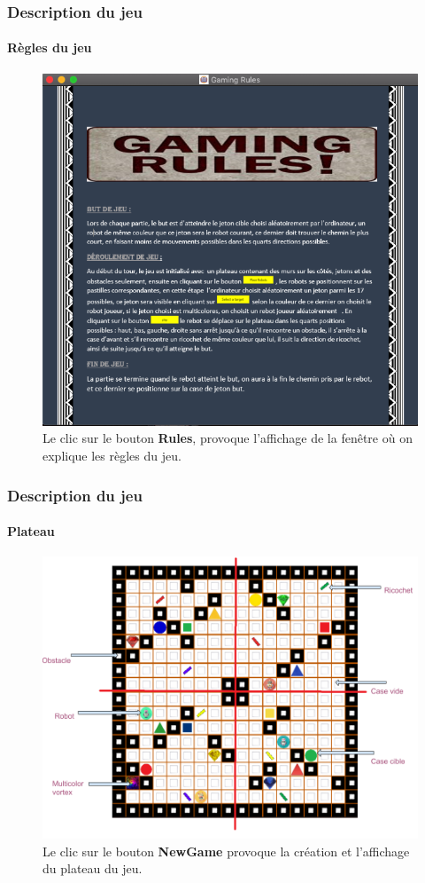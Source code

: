 \documentclass[t]{beamer}
\begin{document}
\begin{frame}
\frametitle{Description du jeu}
\framesubtitle{Règles du jeu}
\begin{center}
\begin{figure}[h!]
\centerline{\includegraphics[scale=0.28]{rules.png}}
\caption{Le clic sur le bouton \textbf{Rules}, provoque l'affichage de la fenêtre où on explique les règles du jeu.}
\end{figure}
\end{center}
\end{frame}

\begin{frame}
\frametitle{Description du jeu}
\framesubtitle{Plateau}
\begin{center}
\begin{figure}[h!]
\centerline{\includegraphics[scale=0.45]{gridDesc.png}}
\caption{Le clic sur le bouton \textbf{NewGame} provoque la création et l'affichage du plateau du jeu.}
\end{figure}
\end{center}
\end{frame}
\end{document}
